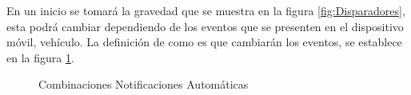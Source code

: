 En un inicio se tomará la gravedad que se muestra en la figura \ref{fig:Disparadores}, esta podrá cambiar dependiendo de los eventos que se presenten en el dispositivo móvil, vehículo. La definición de como es que cambiarán los eventos, se establece en la figura \ref{fig:Combinaciones}.


\begin{figure}[htbp!]
	\centering
	\caption{Combinaciones Notificaciones Automáticas}
	\label{fig:Combinaciones}
\end{figure}



 